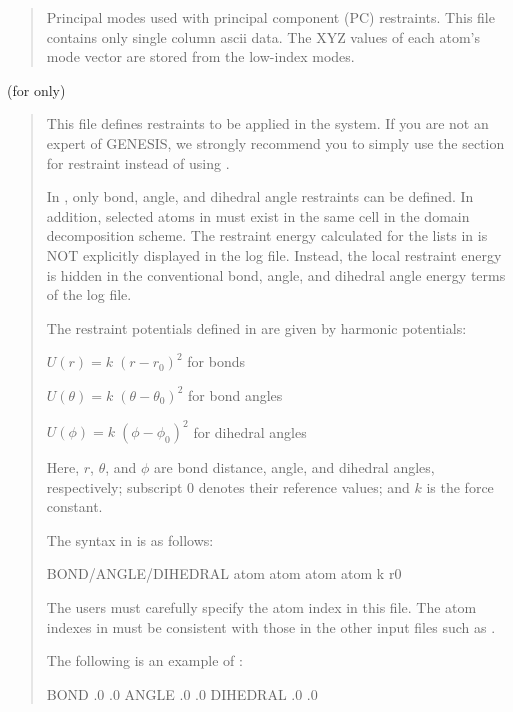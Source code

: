 \documentclass[a4paper,11pt,oneside,english]{sphinxmanual}
\begin{document}
\begin{quote}

Principal modes used with principal component (PC) restraints.
This file contains only single column ascii data.
The XYZ values of each atom’s mode vector are stored from the low-index modes.
\end{quote}

 (for  only)
\begin{quote}

This file defines restraints to be applied in the system.
If you are not an expert of GENESIS, we strongly recommend you to simply use
the \sphinxstylestrong{{[}RESTRAINTS{]}} section for restraint instead of using .

In , only bond, angle, and dihedral angle restraints can be defined.
In addition, selected atoms in  must exist in the same cell
in the domain decomposition scheme.
The restraint energy calculated for the lists in  is NOT explicitly
displayed in the log file. Instead, the local restraint energy is hidden
in the conventional bond, angle, and dihedral angle energy terms of the log file.

The restraint potentials defined in  are given by harmonic potentials:

\(U(r) = k\;(r-r_{0})^{2}\) for bonds

\(U({\theta}) = k\;({\theta}-{\theta}_{0})^{2}\) for bond angles

\(U({\phi}) = k\;({\phi}-{\phi}_{0})^{2}\) for dihedral angles

Here, \(r\), \({\theta}\), and \({\phi}\) are bond distance,
angle, and dihedral angles, respectively; subscript \(0\) denotes their
reference values; and \(k\) is the force constant.

The syntax in  is as follows:

\begin{sphinxVerbatim}[commandchars=\\\{\}]
\PYG{o}{[}BOND/ANGLE/DIHEDRAL\PYG{o}{]}     atom atom \PYG{o}{[}atom \PYG{o}{[}atom\PYG{o}{]}\PYG{o}{]}  k r0
\end{sphinxVerbatim}

The users must carefully specify the atom index in this file.
The atom indexes in  must be consistent with
those in the other input files such as .

The following is an example of :

\begin{sphinxVerbatim}[commandchars=\\\{\}]
BOND                .0 .0
ANGLE            .0 .0
DIHEDRAL          .0 .0
\end{sphinxVerbatim}
\end{quote}
\end{document}
